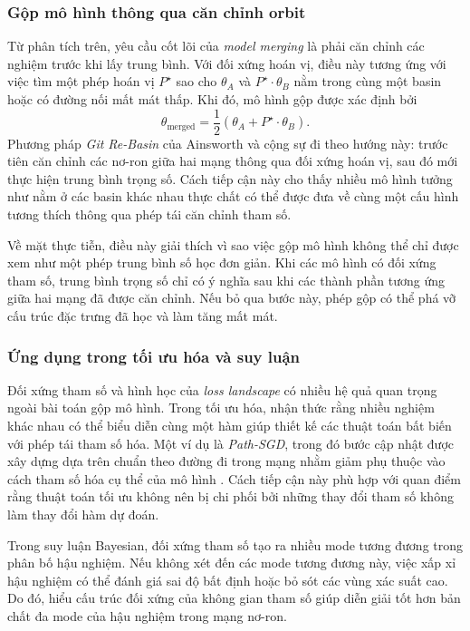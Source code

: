 \subsubsection{Gộp mô hình thông qua căn chỉnh orbit}

Từ phân tích trên, yêu cầu cốt lõi của \textit{model merging} là phải căn chỉnh các nghiệm trước khi lấy trung bình. Với đối xứng hoán vị, điều này tương ứng với việc tìm một phép hoán vị $P^\star$ sao cho $\theta_A$ và $P^\star \cdot \theta_B$ nằm trong cùng một basin hoặc có đường nối mất mát thấp. Khi đó, mô hình gộp được xác định bởi
\begin{equation}
    \theta_{\mathrm{merged}}
    =
    \frac{1}{2}
    \left(
        \theta_A + P^\star \cdot \theta_B
    \right).
    \label{eq:aligned-model-merging}
\end{equation}
Phương pháp \textit{Git Re-Basin} của Ainsworth và cộng sự \cite{ainsworth2023git} đi theo hướng này: trước tiên căn chỉnh các nơ-ron giữa hai mạng thông qua đối xứng hoán vị, sau đó mới thực hiện trung bình trọng số. Cách tiếp cận này cho thấy nhiều mô hình tưởng như nằm ở các basin khác nhau thực chất có thể được đưa về cùng một cấu hình tương thích thông qua phép tái căn chỉnh tham số.

Về mặt thực tiễn, điều này giải thích vì sao việc gộp mô hình không thể chỉ được xem như một phép trung bình số học đơn giản. Khi các mô hình có đối xứng tham số, trung bình trọng số chỉ có ý nghĩa sau khi các thành phần tương ứng giữa hai mạng đã được căn chỉnh. Nếu bỏ qua bước này, phép gộp có thể phá vỡ cấu trúc đặc trưng đã học và làm tăng mất mát.

\subsubsection{Ứng dụng trong tối ưu hóa và suy luận}

Đối xứng tham số và hình học của \textit{loss landscape} có nhiều hệ quả quan trọng ngoài bài toán gộp mô hình. Trong tối ưu hóa, nhận thức rằng nhiều nghiệm khác nhau có thể biểu diễn cùng một hàm giúp thiết kế các thuật toán bất biến với phép tái tham số hóa. Một ví dụ là \textit{Path-SGD}, trong đó bước cập nhật được xây dựng dựa trên chuẩn theo đường đi trong mạng nhằm giảm phụ thuộc vào cách tham số hóa cụ thể của mô hình \cite{neyshabur2015path}. Cách tiếp cận này phù hợp với quan điểm rằng thuật toán tối ưu không nên bị chi phối bởi những thay đổi tham số không làm thay đổi hàm dự đoán.

Trong suy luận Bayesian, đối xứng tham số tạo ra nhiều mode tương đương trong phân bố hậu nghiệm. Nếu không xét đến các mode tương đương này, việc xấp xỉ hậu nghiệm có thể đánh giá sai độ bất định hoặc bỏ sót các vùng xác suất cao. Do đó, hiểu cấu trúc đối xứng của không gian tham số giúp diễn giải tốt hơn bản chất đa mode của hậu nghiệm trong mạng nơ-ron.

